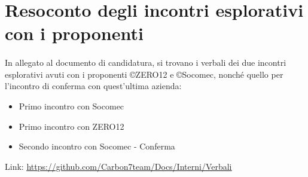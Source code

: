 \section{Resoconto degli incontri esplorativi con i proponenti}
\paragraph{}
In allegato al documento di candidatura, si trovano i verbali dei due incontri
esplorativi avuti con i proponenti \copyright ZERO12 e \copyright Socomec,
nonché quello per l'incontro di conferma con quest'ultima azienda:
\begin{itemize}
  \item Primo incontro con Socomec
  \item Primo incontro con ZERO12
  \item Secondo incontro con Socomec - Conferma
\end{itemize}
Link: \textcolor{blue}{\underline{\url{https://github.com/Carbon7team/Docs/Interni/Verbali}}}
